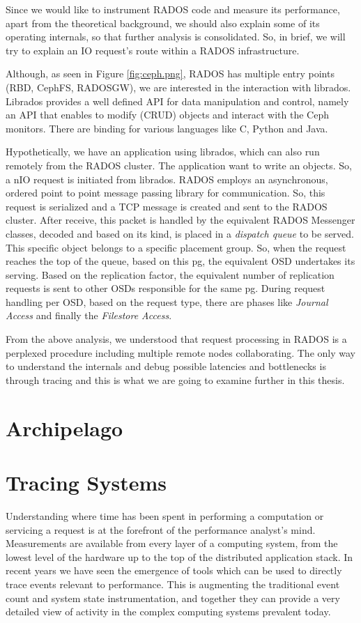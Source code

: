 Since we would like to instrument RADOS code and measure its performance, apart
from the theoretical background, we should also explain some of its operating
internals, so that further analysis is consolidated. So, in brief, we will try
to explain an IO request's route within a RADOS infrastructure.

Although, as seen in Figure \ref{fig:ceph.png}, RADOS has multiple entry points
(RBD, CephFS, RADOSGW), we are interested in the interaction with librados.
Librados provides a well defined API for data manipulation and control, namely
an API that enables to modify (CRUD) objects and interact with the Ceph
monitors. There are binding for various languages like C, Python and Java. 

Hypothetically, we have an application using librados, which can also run
remotely from the RADOS cluster. The application want to write an objects. So, a
nIO request is initiated from librados. RADOS employs an asynchronous, ordered
point to point message passing library for communication. So, this request is
serialized and a TCP message is created and sent to the RADOS cluster. After
receive, this packet is handled by the equivalent RADOS Messenger classes,
decoded and based on its kind, is placed in a \textit{dispatch queue} to be
served. This specific object belongs to a specific placement group. So, when the
request reaches the top of the queue, based on this pg, the equivalent OSD
undertakes its serving. Based on the replication factor, the equivalent number
of replication requests is sent to other OSDs responsible for the same pg.
During request handling per OSD, based on the request type, there are phases
like \textit{Journal Access} and finally the \textit{Filestore Access}.

From the above analysis, we understood that request processing in RADOS is a
perplexed procedure including multiple remote nodes collaborating. The only way
to understand the internals and debug possible latencies and bottlenecks is
through tracing and this is what we are going to examine further in this thesis.

\section{Archipelago}\label{sec:archip-bkg}

\section{Tracing Systems}\label{sec:tracing-bkg}
Understanding where time has been spent in performing a computation or servicing
a request is at the forefront of the performance analyst’s mind. Measurements
are available from every layer of a computing system, from the lowest level of
the hardware up to the top of the distributed application stack. In recent years
we have seen the emergence of tools which can be used to directly trace events
relevant to performance. This is augmenting the traditional event count and
system state instrumentation, and together they can provide a very detailed view
of activity in the complex computing systems prevalent today.


